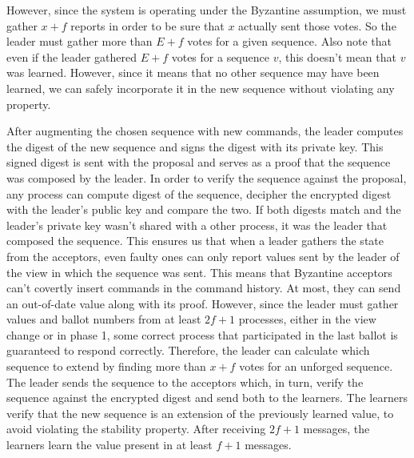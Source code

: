 However, since the system is operating under the Byzantine assumption, we must gather $x+f$ reports in order to be sure that $x$ actually sent those votes. So the leader must gather more than $E+f$ votes for a given sequence. Also note that even if the leader gathered $E+f$ votes for a sequence $v$, this doesn't mean that $v$ was learned. However, since it means that no other sequence may have been learned, we can safely incorporate it in the new sequence without violating any property. \par
After augmenting the chosen sequence with new commands, the leader computes the digest of the new sequence and signs the digest with its private key. This signed digest is sent with the proposal and serves as a proof that the sequence was composed by the leader. In order to verify the sequence against the proposal, any process can compute digest of the sequence, decipher the encrypted digest with the leader's public key and compare the two. If both digests match and the leader's private key wasn't shared with a other process, it was the leader that composed the sequence.  This ensures us that when a leader gathers the state from the acceptors, even faulty ones can only report values sent by the leader of the view in which the sequence was sent. This means that Byzantine acceptors can't covertly insert commands in the command history. At most, they can send an out-of-date value along with its proof. However, since the leader must gather values and ballot numbers from at least $2f+1$ processes, either in the view change or in phase 1, some correct process that participated in the last ballot is guaranteed to respond correctly. Therefore, the leader can calculate which sequence to extend by finding more than $x+f$ votes for an unforged sequence. The leader sends the sequence to the acceptors which, in turn, verify the sequence against the encrypted digest and send both to the learners. The learners verify that the new sequence is an extension of the previously learned value, to avoid violating the stability property. After receiving $2f+1$ messages, the learners learn the value present in at least $f+1$ messages. \par
